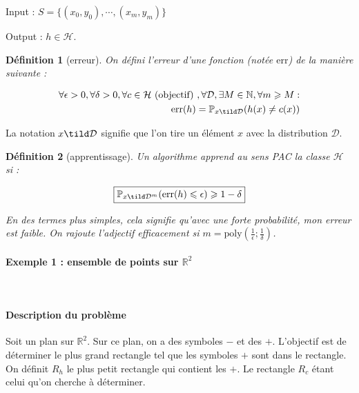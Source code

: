 \documentclass{article}
\newtheorem{definition}{Définition}
\newcommand{\err}{\text{err}}
\begin{document}
Input : $S = \{(x_0, y_0), \cdots , (x_m, y_m)\}$

Output : $h \in \mathcal{H}$.

\begin{definition}[erreur]
On défini l'erreur d'une fonction (notée $\err$) de la manière suivante :

\begin{align*}
  \forall \epsilon > 0, \forall \delta > 0, \forall c \in \mathcal{H} \text{ (objectif) }, \forall \mathcal{D}, \exists M \in \mathbb{N}, \forall m \geqslant M : \\
  \err(h) = \mathbb{P}_{x \tild \mathcal{D}}(h(x) \ne c(x))
\end{align*}

\end{definition}

La notation $x \tild \mathcal{D}$ signifie que l'on tire un élément $x$ avec la distribution $\mathcal{D}$.

\begin{definition}[apprentissage]
\label{definition:apprentissage}
Un algorithme apprend au sens PAC la classe $\mathcal{H}$ si :

\begin{equation}
  \label{equation:pac}
  \boxed{
\mathbb{P}_{x \tild \mathcal{D}^m} (\err(h) \leqslant \epsilon) \geqslant 1- \delta
  }
\end{equation}

En des termes plus simples, cela signifie qu'avec une forte probabilité, mon erreur est faible. On rajoute l'adjectif efficacement si $m = \text{poly}(\frac{1}{\epsilon} ; \frac{1}{\delta})$.

\end{definition}

\paragraph{Exemple 1 : ensemble de points sur $\mathbb{R}^2$}~\\

\paragraph{Description du problème} Soit un plan sur $\mathbb{R}^2$. Sur ce plan, on a des symboles $-$ et des $+$. L'objectif est de déterminer le plus grand rectangle tel que les symboles $+$ sont dans le rectangle. On définit $R_h$ le plus petit rectangle qui contient les $+$. Le rectangle $R_c$ étant celui qu'on cherche à déterminer.
\end{document}

